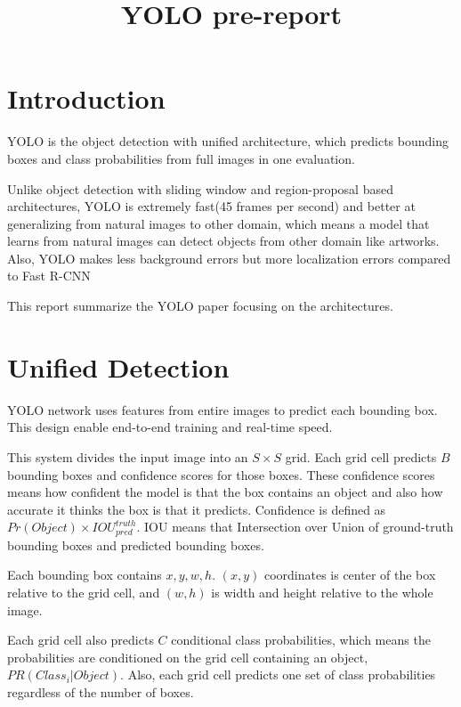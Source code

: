 \documentclass[extendedabs]{bmvc2k}
\begin{document}
\title{YOLO pre-report}

 
\maketitle
\noindent



\section{Introduction}
YOLO\cite{yolopaper} is the object detection with unified architecture, which predicts bounding boxes and class probabilities from full images in one evaluation. 

Unlike object detection with sliding window and region-proposal based architectures, YOLO is extremely fast(45 frames per second) and better at generalizing from natural images to other domain, which means a model that learns from natural images can detect objects from other domain like artworks. Also, YOLO makes less background errors but more localization errors compared to Fast R-CNN\cite{fastrcnn}

This report summarize the YOLO paper\cite{yolopaper} focusing on the architectures.

\section{Unified Detection}
YOLO network uses features from entire images to predict each bounding box. This design enable end-to-end training and real-time speed.

This system divides the input image into an $S\times S$ grid. Each grid cell predicts $B$ bounding boxes and confidence scores for those boxes. These confidence scores means how confident the model is that the box contains an object and also how accurate it thinks the box is that it predicts. Confidence is defined as $Pr(Object) \times IOU^{truth}_{pred}$. IOU means that Intersection over Union of ground-truth bounding boxes and predicted bounding boxes.

Each bounding box contains $x,y,w,h$. $(x,y)$ coordinates is center of the box relative to the grid cell, and $(w,h)$ is width and height relative to the whole image.

Each grid cell also predicts $C$ conditional class probabilities, which means the probabilities are conditioned on the grid cell containing an object, $PR(Class_i | Object)$. Also, each grid cell predicts one set of class probabilities regardless of the number of boxes.
\end{document}
